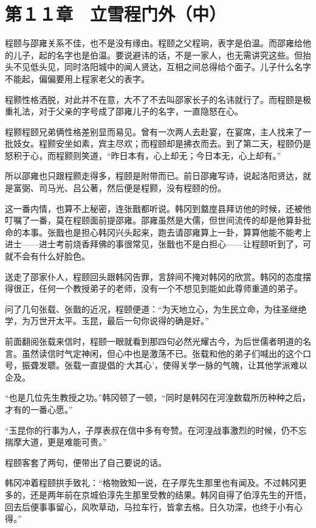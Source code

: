 \section{第１１章　立雪程门外（中）}

程颐与邵雍关系不佳，也不是没有缘由。程颐之父程珦，表字是伯温。而邵雍给他的儿子，起的名字也是伯温。要说避讳的话，不是一家人，也无需讲究这些。但抬头不见低头见，同时洛阳城中的闻人贤达，互相之间总得给个面子。儿子什么名字不能起，偏偏要用上程家老父的表字。

程颢性格洒脱，对此并不在意，大不了不去叫邵家长子的名讳就行了。而程颐是极重礼法，对于父亲的字号成了邵雍儿子的名字，一直隐怒在心。

程颢程颐兄弟俩性格差别显而易见。曾有一次两人去赴宴，在宴席，主人找来了一批妓女。程颢安坐如素，宾主尽欢；而程颐却是拂衣而去。到了第二天，程颐仍是怒积于心，而程颢则笑道，“昨日本有，心上却无；今日本无，心上却有。”

所以邵雍也只跟程颢走得多，程颐是附带而已。前日邵雍写诗，说起洛阳贤达，就是富弼、司马光、吕公著，然后便是程颢，没有程颐的份。

这一番内情，也算不上秘密，连张戬都听说。韩冈到盩庢县拜访他的时候，还被他叮嘱了一番，莫在程颐面前提邵雍。邵雍虽然是大儒，但世间流传的却是他算卦批命的本事。张戬也是担心韩冈兴头起来，跑去请邵雍算上一卦，算算他能不能考上进士——进士考前烧香拜佛的事很常见，张戬也不是白担心——让程颐听到了，可就不会有什么好脸色。

送走了邵家仆人，程颐回头跟韩冈告罪，言辞间不掩对韩冈的欣赏。韩冈的态度摆得很正，任何一个教授弟子的老师，没有一个不想见到能如此尊师重道的弟子。

问了几句张载、张戬的近况，程颐便道：“为天地立心，为生民立命，为往圣继绝学，为万世开太平。玉昆，最后一句你说得的确是好。”

前面翻阅张载来信时，程颐一眼就看到那四句必然光耀古今，为后世儒者明道的名言。虽然读信时气定神闲，但心中也是激荡不已。张载和他的弟子们喊出的这个口号，振聋发聩。张载一直提倡的‘大其心’，使得关学一脉的气魄，让其他学派难以企及。

“也是几位先生教授之功。”韩冈顿了一顿，“同时是韩冈在河湟数载所历种种之后，才有的一番心愿。”

“玉昆你的行事为人，子厚表叔在信中多有夸赞。在河湟战事激烈的时候，仍不忘揣摩大道，更是难能可贵。”

程颐客套了两句，便带出了自己要说的话。

韩冈冲着程颐拱手致礼：“格物致知一说，在子厚先生那里也有闻及。不过韩冈更多的，还是两年前在京城伯淳先生那里受教的结果。韩冈自得了伯淳先生的开悟，回去后便事事留心，风吹草动，马拉车行，皆拿去格。日久功深，也终于小有心得。”

